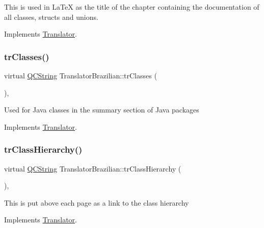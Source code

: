 This is used in La\+TeX as the title of the chapter containing the documentation of all classes, structs and unions. 

Implements \mbox{\hyperlink{class_translator}{Translator}}.

\mbox{\label{class_translator_brazilian_a5c5ff35fe11088ba2c5e3fe578b081d3}} 
\subsubsection{\texorpdfstring{trClasses()}{trClasses()}}
{\footnotesize\ttfamily virtual \mbox{\hyperlink{class_q_c_string}{Q\+C\+String}} Translator\+Brazilian\+::tr\+Classes (\begin{DoxyParamCaption}{ }\end{DoxyParamCaption})\hspace{0.3cm}{\ttfamily [inline]}, {\ttfamily [virtual]}}

Used for Java classes in the summary section of Java packages 

Implements \mbox{\hyperlink{class_translator}{Translator}}.

\mbox{\label{class_translator_brazilian_ad7d00e99ad33e92fe0624b8f669337a6}} 
\subsubsection{\texorpdfstring{trClassHierarchy()}{trClassHierarchy()}}
{\footnotesize\ttfamily virtual \mbox{\hyperlink{class_q_c_string}{Q\+C\+String}} Translator\+Brazilian\+::tr\+Class\+Hierarchy (\begin{DoxyParamCaption}{ }\end{DoxyParamCaption})\hspace{0.3cm}{\ttfamily [inline]}, {\ttfamily [virtual]}}

This is put above each page as a link to the class hierarchy 

Implements \mbox{\hyperlink{class_translator}{Translator}}.

\mbox{\label{class_translator_brazilian_a8a0e93f338087f5eaf2e11aeec3fcde8}} 
